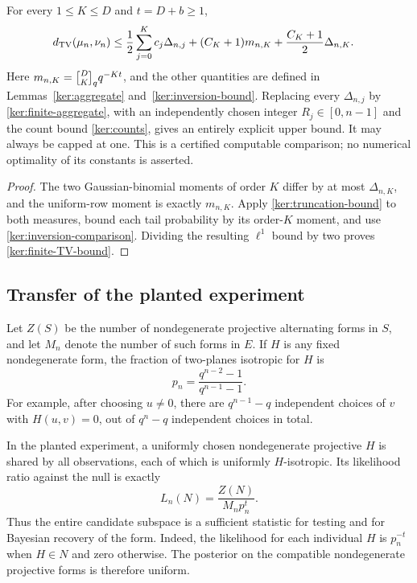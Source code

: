 \begin{corollary}
\label{ker:finite-TV}
For every $1\le K\le D$ and $t=D+b\ge1$,
\begin{equation}
 \begin{split}
 d_{\mathrm{TV}}(\mu_n,\nu_n)\le{}&
 \frac12\sum_{j=0}^Kc_j\Delta_{n,j}
 +(C_K+1)m_{n,K}
 +\frac{C_K+1}{2}\Delta_{n,K}.
 \end{split}
 \label{ker:finite-TV-bound}
\end{equation}
Here $m_{n,K}=\qbinom DK q^{-Kt}$, and the other quantities are
defined in Lemmas~\ref{ker:aggregate} and~\ref{ker:inversion-bound}.
Replacing every $\Delta_{n,j}$ by \eqref{ker:finite-aggregate}, with
an independently chosen integer $R_j\in[0,n-1]$ and the count bound
\eqref{ker:counts}, gives an entirely explicit upper bound.  It may
always be capped at one.  This is a certified computable comparison;
no numerical optimality of its constants is asserted.
\end{corollary}

\begin{proof}
The two Gaussian-binomial moments of order $K$ differ by at most
$\Delta_{n,K}$, and the uniform-row moment is exactly $m_{n,K}$.
Apply \eqref{ker:truncation-bound} to both measures, bound each tail
probability by its order-$K$ moment, and use
\eqref{ker:inversion-comparison}.  Dividing the resulting $\ell^1$
bound by two proves \eqref{ker:finite-TV-bound}.
\end{proof}

\subsection{Transfer of the planted experiment}

Let $Z(S)$ be the number of nondegenerate projective alternating forms
in $S$, and let $M_n$ denote the number of such forms in $E$.
If $H$ is any fixed nondegenerate form, the fraction of two-planes
isotropic for $H$ is
\begin{equation}
 p_n=\frac{q^{n-2}-1}{q^{n-1}-1}.
 \label{ker:isotropic-probability}
\end{equation}
For example, after choosing $u\ne0$, there are $q^{n-1}-q$
independent choices of $v$ with $H(u,v)=0$, out of $q^n-q$
independent choices in total.

In the planted experiment, a uniformly chosen nondegenerate
projective $H$ is shared by all observations, each of which is
uniformly $H$-isotropic.  Its likelihood ratio against the null is
exactly
\begin{equation}
 L_n(N)=\frac{Z(N)}{M_np_n^t}.
 \label{ker:actual-likelihood}
\end{equation}
Thus the entire candidate subspace is a sufficient statistic for
testing and for Bayesian recovery of the form.  Indeed, the
likelihood for each individual $H$ is $p_n^{-t}$ when $H\in N$ and
zero otherwise.  The posterior on the compatible nondegenerate
projective forms is therefore uniform.

